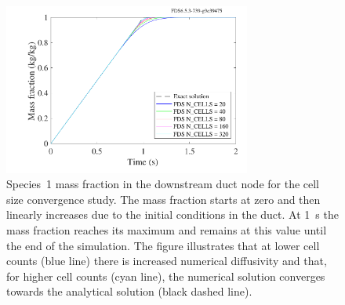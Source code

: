 \documentclass[11pt]{book}
\begin{document}
\begin{figure}[ht]
\centering
\includegraphics[width=3.2in]{SCRIPT_FIGURES/HVAC_mass_transport_convergence_1}
\caption[ test case result.]{Species~\num{1} mass fraction in the downstream duct node for the cell size convergence study. The mass fraction starts at zero and then linearly increases due to the initial conditions in the duct. At \SI{1}{\second} the mass fraction reaches its maximum and remains at this value until the end of the simulation. The figure illustrates that at lower cell counts (blue line) there is increased numerical diffusivity and that, for higher cell counts (cyan line), the numerical solution converges towards the analytical solution (black dashed line).}
\label{fig_HVAC_mass_transport_conv_1}
\end{figure}
\end{document}
